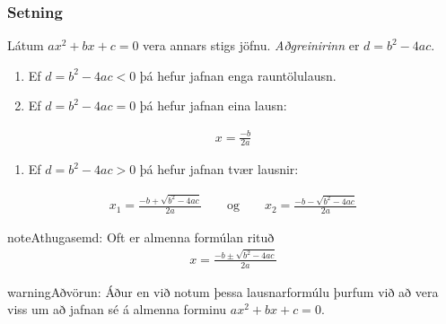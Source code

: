 \documentclass[a4paper,10pt,icelandic]{sphinxmanual}
\begin{document}
\subsubsection{Setning}
\label{\detokenize{Kafli02:setning}}
Látum \(ax^2+bx+c=0\) vera annars stigs jöfnu. \textit{Aðgreinirinn} er \(d = b^2-4ac\).
\begin{enumerate}
%
\item {} 
Ef \(d = b^2-4ac<0\) þá hefur jafnan enga rauntölulausn.

\item {} 
Ef \(d  = b^2-4ac=0\) þá hefur jafnan eina lausn:

\end{enumerate}
\begin{equation*}
\begin{split}x=\frac{-b}{2a}\end{split}
\end{equation*}\begin{enumerate}
%
\setcounter{enumi}{2}
\item {} 
Ef \(d = b^2-4ac>0\) þá hefur jafnan tvær lausnir:

\end{enumerate}
\begin{equation*}
\begin{split}x_1=\frac{-b+\sqrt{b^2-4ac}}{2a} \qquad \text{og} \qquad x_2=\frac{-b-\sqrt{b^2-4ac}}{2a}\end{split}
\end{equation*}
\begin{sphinxadmonition}{note}{Athugasemd:}
Oft er almenna formúlan rituð
\begin{equation*}
\begin{split}x=\frac{-b\pm\sqrt{b^2-4ac}}{2a}\end{split}
\end{equation*}\end{sphinxadmonition}

\begin{sphinxadmonition}{warning}{Aðvörun:}
Áður en við notum þessa lausnarformúlu þurfum við að vera viss um að jafnan sé á almenna forminu \(ax^2+bx+c=0\).
\end{sphinxadmonition}
\end{document}
